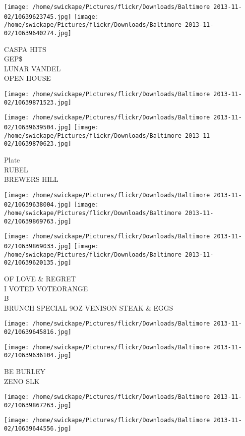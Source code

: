 \documentclass[10pt,letterpaper]{article}
\begin{document}
\texttt{[image: /home/swickape/Pictures/flickr/Downloads/Baltimore 2013-11-02/10639623745.jpg]}
\texttt{[image: /home/swickape/Pictures/flickr/Downloads/Baltimore 2013-11-02/10639640274.jpg]}

CASPA HITS\\
GEP\$\\
LUNAR VANDEL\\
OPEN HOUSE
\pagebreak

\texttt{[image: /home/swickape/Pictures/flickr/Downloads/Baltimore 2013-11-02/10639871523.jpg]}

\vspace{0.25in}
\texttt{[image: /home/swickape/Pictures/flickr/Downloads/Baltimore 2013-11-02/10639639504.jpg]}
\texttt{[image: /home/swickape/Pictures/flickr/Downloads/Baltimore 2013-11-02/10639870623.jpg]}

Plate\\
RUBEL\\
BREWERS HILL
\pagebreak

\texttt{[image: /home/swickape/Pictures/flickr/Downloads/Baltimore 2013-11-02/10639638004.jpg]}
\texttt{[image: /home/swickape/Pictures/flickr/Downloads/Baltimore 2013-11-02/10639869763.jpg]}

\texttt{[image: /home/swickape/Pictures/flickr/Downloads/Baltimore 2013-11-02/10639869033.jpg]}
\texttt{[image: /home/swickape/Pictures/flickr/Downloads/Baltimore 2013-11-02/10639620135.jpg]}

OF LOVE \& REGRET\\
I VOTED VOTEORANGE\\
B\\
BRUNCH SPECIAL 9OZ VENISON STEAK \& EGGS
\pagebreak

\texttt{[image: /home/swickape/Pictures/flickr/Downloads/Baltimore 2013-11-02/10639645816.jpg]}

\vspace{0.25in}
\texttt{[image: /home/swickape/Pictures/flickr/Downloads/Baltimore 2013-11-02/10639636104.jpg]}

BE BURLEY\\
ZENO SLK
\pagebreak

\texttt{[image: /home/swickape/Pictures/flickr/Downloads/Baltimore 2013-11-02/10639867263.jpg]}

\vspace{0.25in}
\texttt{[image: /home/swickape/Pictures/flickr/Downloads/Baltimore 2013-11-02/10639644556.jpg]}
\end{document}
